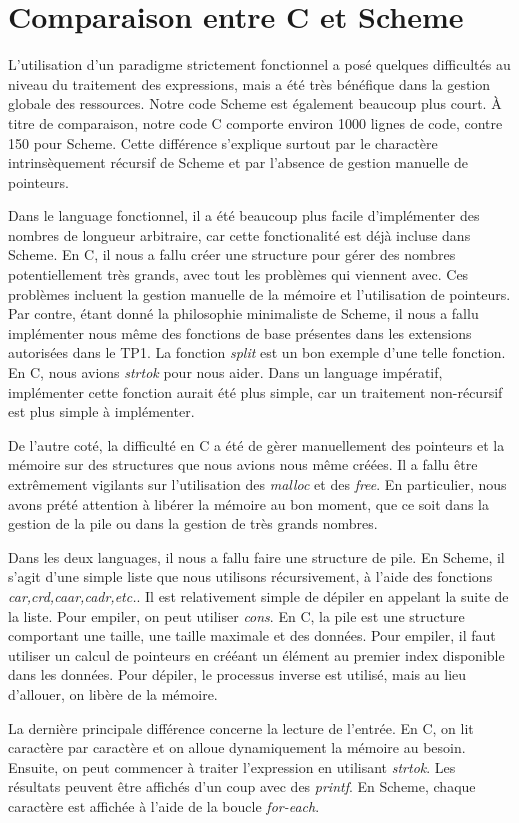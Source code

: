 \documentclass[letterpaper,12pt]{scrartcl}
\begin{document}
	\section{Comparaison entre C et Scheme}
	
	L'utilisation d'un paradigme strictement fonctionnel a posé quelques difficultés au niveau du traitement des expressions, mais a été très bénéfique dans la gestion globale des ressources. Notre code Scheme est également beaucoup plus court. À titre de comparaison, notre code C comporte environ 1000 lignes de code, contre 150 pour Scheme. Cette différence s'explique surtout par le charactère intrinsèquement récursif de Scheme et par l'absence de gestion manuelle de pointeurs.
	
	Dans le language fonctionnel, il a été beaucoup plus facile d'implémenter des nombres de longueur arbitraire, car cette fonctionalité est déjà incluse dans Scheme. En C, il nous a fallu créer une structure pour gérer des nombres potentiellement très grands, avec tout les problèmes qui viennent avec. Ces problèmes incluent la gestion manuelle de la mémoire et l'utilisation de pointeurs. Par contre, étant donné la philosophie minimaliste de Scheme, il nous a fallu implémenter nous même des fonctions de base présentes dans les extensions autorisées dans le TP1. La fonction \textit{split} est un bon exemple d'une telle fonction. En C, nous avions \textit{strtok} pour nous aider. Dans un language impératif, implémenter cette fonction aurait été plus simple, car un traitement non-récursif est plus simple à implémenter. 
	
	De l'autre coté, la difficulté en C a été de gèrer manuellement des pointeurs et la mémoire sur des structures que nous avions nous même créées. Il a fallu être extrêmement vigilants sur l'utilisation des \textit{malloc} et des \textit{free}. En particulier, nous avons prété attention à libérer la mémoire au bon moment, que ce soit dans la gestion de la pile ou dans la gestion de très grands nombres.
	
	Dans les deux languages, il nous a fallu faire une structure de pile. En Scheme, il s'agit d'une simple liste que nous utilisons récursivement, à l'aide des fonctions \textit{car,crd,caar,cadr,etc.}. Il est relativement simple de dépiler en appelant la suite de la liste. Pour empiler, on peut utiliser \textit{cons}.  En C, la pile est une structure comportant une taille, une taille maximale et des données. Pour empiler, il faut utiliser un calcul de pointeurs en crééant un élément au premier index disponible dans les données. Pour dépiler, le processus inverse est utilisé, mais au lieu d'allouer, on libère de la mémoire.
	
	La dernière principale différence concerne la lecture de l'entrée. En C, on lit caractère par caractère et on alloue dynamiquement la mémoire au besoin. Ensuite, on peut commencer à traiter l'expression en utilisant \textit{strtok}. Les résultats peuvent être affichés d'un coup avec des \textit{printf}. En Scheme, chaque caractère est affichée à l'aide de la boucle \textit{for-each}.
\end{document}
